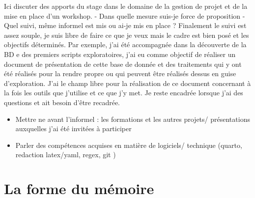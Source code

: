 \documentclass[
  12pt,
  a4paper,
]{scrbook}
\providecommand{\tightlist}{%
  \setlength{\itemsep}{0pt}\setlength{\parskip}{0pt}}\usepackage{longtable,booktabs,array}
\begin{document}
Ici discuter des apports du stage dans le domaine de la gestion de
projet et de la mise en place d'un workshop. - Dans quelle mesure
suis-je force de proposition - Quel suivi, même informel est mis ou
ai-je mis en place ? Finalement le suivi est assez souple, je suis libre
de faire ce que je veux mais le cadre est bien posé et les objectifs
déterminés. Par exemple, j'ai été accompagnée dans la découverte de la
BD e des premiers scripts exploratoires, j'ai eu comme objectif de
réaliser un document de présentation de cette base de donnée et des
traitements qui y ont été réalisés pour la rendre propre ou qui peuvent
être réalisés dessus en guise d'exploration. J'ai le champ libre pour la
réalisation de ce document concernant à la fois les outils que j'utilise
et ce que j'y met. Je reste encadrée lorsque j'ai des questions et ait
besoin d'être recadrée.

\begin{itemize}
\tightlist
\item
  Mettre ne avant l'informel : les formations et les autres projets/
  présentations auxquelles j'ai été invitées à participer
\item
  Parler des compétences acquises en matière de logiciels/ technique
  (quarto, redaction latex/yaml, regex, git )
\end{itemize}

\hypertarget{la-forme-du-muxe9moire}{%
\section*{La forme du mémoire}\label{la-forme-du-muxe9moire}}
\end{document}
